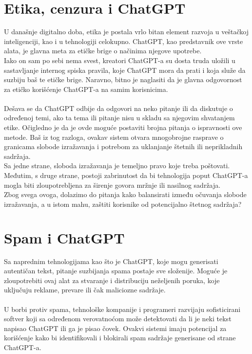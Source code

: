 \documentclass[fleqn, 12pt]{article}
\begin{document}
\section{Etika, cenzura i ChatGPT}
    U današnje digitalno doba, etika je postala vrlo bitan element razvoja u veštačkoj inteligenciji, kao i u tehnologiji celokupno. ChatGPT, kao predstavnik ove vrste alata, je glavna meta za etičke brige o načinima njegove upotrebe.
    \\
    Iako on sam po sebi nema svest, kreatori ChatGPT-a su dosta truda uložili u sastavljanje internog spiska pravila, koje ChatGPT mora da prati i koja služe da suzbiju baš te etičke brige. Naravno, bitno je naglasiti da je glavna odgovornost za etičko korišćenje ChatGPT-a na samim korisnicima.
    \\\\
    Dešava se da ChatGPT odbije da odgovori na neko pitanje ili da diskutuje o određenoj temi, ako ta tema ili pitanje nisu u skladu sa njegovim shvatanjem etike. Očigledno je da je ovde moguće postaviti brojna pitanja o ispravnosti ove metode. Baš iz tog razloga, ovakav sistem otvara mnogobrojne rasprave o granicama slobode izražavanja i potrebom za uklanjanje štetnih ili neprikladnih sadržaja.
    \\
    Sa jedne strane, sloboda izražavanja je temeljno pravo koje treba poštovati. Međutim, s druge strane, postoji zabrinutost da bi tehnologija poput ChatGPT-a mogla biti zloupotrebljena za širenje govora mržnje ili nasilnog sadržaja.
    \\
    Zbog svega ovoga, dolazimo do pitanja kako balansirati između očuvanja slobode izražavanja, a u istom mahu, zaštiti korisnike od potencijalno štetnog sadržaja?

\section{Spam i ChatGPT}
    Sa naprednim tehnologijama kao što je ChatGPT, koje mogu generisati autentičan tekst, pitanje suzbijanja spama postaje sve složenije. Moguće je zloupotrebiti ovaj alat za stvaranje i distribuciju neželjenih poruka, koje uključuju reklame, prevare ili čak maliciozne sadržaje.
    \\\\
    U borbi protiv spama, tehnološke kompanije i programeri razvijaju sofisticirani softver koji sa određenom verovatnoćom može detektovati da li je neki tekst napisao ChatGPT ili ga je pisao čovek. Ovakvi sistemi imaju potencijal za korišćenje kako bi identifikovali i blokirali spam sadržaje generisane od strane ChatGPT-a.
\newpage
\end{document}
